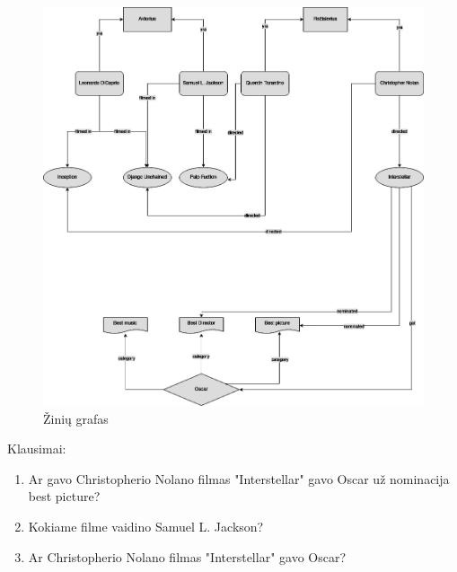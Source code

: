 \documentclass{VUMIFPSkursinis}
\begin{document}
\begin{figure}[htbp]
  \centering
  \includegraphics[width=1\textwidth]{img/grafas.jpeg}
  \caption{Žinių grafas}
  \label{fig:sample_image}
\end{figure}
\pagebreak

Klausimai:
\begin{enumerate}
    \item Ar gavo Christopherio Nolano filmas "Interstellar" gavo Oscar už nominacija best picture?
    \item Kokiame filme vaidino Samuel L. Jackson?
    \item Ar Christopherio Nolano filmas "Interstellar" gavo Oscar?
\end{enumerate}
\end{document}
